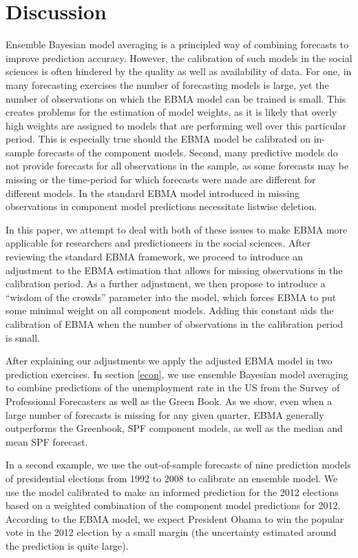 \documentclass[12pt,fullpage,endnotes]{article}
\begin{document}
\section{Discussion} 

Ensemble Bayesian model averaging is a principled way of combining
forecasts to improve prediction accuracy. However, the calibration of
such models in the social sciences is often hindered by the quality as
well as availability of data. For one, in many forecasting exercises
the number of forecasting models is large, yet the number of
observations on which the EBMA model can be trained is small. This
creates problems for the estimation of model weights, as it is likely
that overly high weights are assigned to models that are performing
well over this particular period. This is especially true should the
EBMA model be calibrated on in-sample forecasts of the component
models. Second, many predictive models do not provide forecasts for
all observations in the sample, as some forecasts may be missing or
the time-period for which forecasts were made are different for
different models. In the standard EBMA model introduced in
\citet{mhw:2012} missing observations in component model predictions
necessitate listwise deletion.


In this paper, we attempt to deal with both of these issues to make
EBMA more applicable for researchers and predictioneers in the social
sciences. After reviewing the standard EBMA framework, we proceed to
introduce an adjustment to the EBMA estimation that allows for missing
observations in the calibration period. As a further adjustment, we
then propose to introduce a ``wisdom of the crowds'' parameter into
the model, which forces EBMA to put some minimal weight on all
component models. Adding this constant aids the calibration of EBMA
when the number of observations in the calibration period is small.

After explaining our adjustments we apply the adjusted EBMA model in
two prediction exercises. In section \ref{econ}, we use ensemble
Bayesian model averaging to combine predictions of the unemployment
rate in the US from the Survey of Professional Forecasters as well as
the Green Book. As we show, even when a large number of forecasts is
missing for any given quarter, EBMA generally outperforms the
Greenbook, SPF component models, as well as the median and mean SPF
forecast. 

In a second example, we use the out-of-sample forecasts of nine
prediction models of presidential elections from 1992 to 2008 to
calibrate an ensemble model. We use the model calibrated to make an
informed prediction for the 2012 elections based on a weighted
combination of the component model predictions for 2012. According to
the EBMA model, we expect President Obama to win the popular vote in
the 2012 election by a small margin (the uncertainty estimated around
the prediction is quite large).
\end{document}
